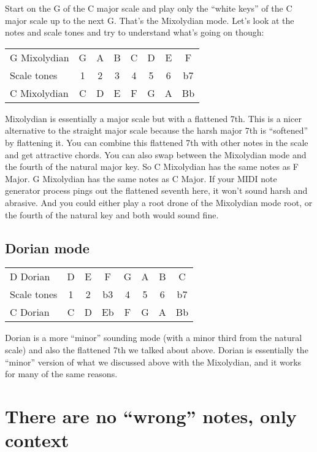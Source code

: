 \documentclass[
  12pt,
  letterpaper,
  oneside,
  open=any]{scrbook}
\begin{document}
Start on the G of the C major scale and play only the ``white keys'' of
the C major scale up to the next G. That's the Mixolydian mode. Let's
look at the notes and scale tones and try to understand what's going on
though:

\begin{longtable}[]{@{}lccccccc@{}}
\toprule\noalign{}
\endhead
\bottomrule\noalign{}
\endlastfoot
G Mixolydian & G & A & B & C & D & E & F \\
Scale tones & 1 & 2 & 3 & 4 & 5 & 6 & b7 \\
C Mixolydian & C & D & E & F & G & A & Bb \\
\end{longtable}

Mixolydian is essentially a major scale but with a flattened 7th. This
is a nicer alternative to the straight major scale because the harsh
major 7th is ``softened'' by flattening it. You can combine this
flattened 7th with other notes in the scale and get attractive chords.
You can also swap between the Mixolydian mode and the fourth of the
natural major key. So C Mixolydian has the same notes as F Major. G
Mixolydian has the same notes as C Major. If your MIDI note generator
process pings out the flattened seventh here, it won't sound harsh and
abrasive. And you could either play a root drone of the Mixolydian mode
root, or the fourth of the natural key and both would sound fine.

\subsection{Dorian mode}\label{dorian-mode}

\begin{longtable}[]{@{}lccccccc@{}}
\toprule\noalign{}
\endhead
\bottomrule\noalign{}
\endlastfoot
D Dorian & D & E & F & G & A & B & C \\
Scale tones & 1 & 2 & b3 & 4 & 5 & 6 & b7 \\
C Dorian & C & D & Eb & F & G & A & Bb \\
\end{longtable}

Dorian is a more ``minor'' sounding mode (with a minor third from the
natural scale) and also the flattened 7th we talked about above. Dorian
is essentially the ``minor'' version of what we discussed above with the
Mixolydian, and it works for many of the same reasons.

\section{There are no ``wrong'' notes, only
context}\label{there-are-no-wrong-notes-only-context}
\end{document}
